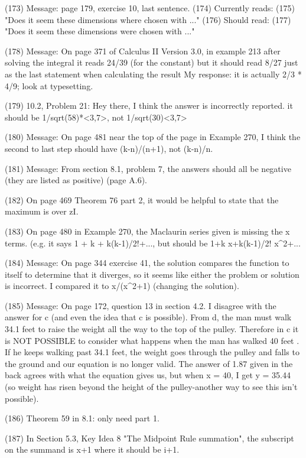 {(173)  Message: page 179, exercise 10, last sentence.    
(174)  Currently reads:
(175)  "Does it seem these dimensions where chosen with ..."
(176)  Should read:
(177)  "Does it seem these dimensions were chosen with ..."

(178)  Message: On page 371 of Calculus II Version 3.0, in example 213 after solving the integral it reads 24/39 (for the constant) but it should read 8/27 just as the last statement when calculating the result   My response: it is actually 2/3 * 4/9; look at typesetting.


(179)  10.2, Problem 21: Hey there, I think the answer is incorrectly reported. it should be 1/sqrt(58)*<3,7>, not 1/sqrt(30)<3,7>

(180)  Message: On page 481 near the top of the page in Example 270, I think the second to last step should have (k-n)/(n+1), not (k-n)/n.

(181)  Message: From section 8.1, problem 7, the answers should all be negative (they are listed as positive) (page A.6).

(182)  On page 469 Theorem 76 part 2, it would be helpful to state that the maximum is over z\in I.

(183)  On page 480 in Example 270, the Maclaurin series given is missing the x terms. (e.g. it says 1 + k + k(k-1)/2!+..., but should be 1+k x+k(k-1)/2! x^2+...

(184)  Message: On page 344 exercise 41, the solution compares the function to itself to determine that it diverges, so it seems like either the problem or solution is incorrect. I compared it to x/(x^2+1) (changing the solution).

(185)  Message: On page 172, question 13 in section 4.2. I disagree with the answer for c (and even the idea that c is possible). From d, the man must walk 34.1 feet to raise the weight all the way to the top of the pulley. Therefore in c it is NOT POSSIBLE to consider what happens when the man has walked 40 feet . If he keeps walking past 34.1 feet, the weight goes through the pulley and falls to the ground and our equation is no longer valid. The answer of 1.87 given in the back agrees with what the equation gives us, but when x = 40, I get y = 35.44 (so weight has risen beyond the height of the pulley-another way to see this isn't possible).

(186)  Theorem 59 in 8.1: only need part 1.

(187)  In Section 5.3, Key Idea 8 "The Midpoint Rule summation", the subscript on the summand is {x+1} where it should be {i+1}.

}
